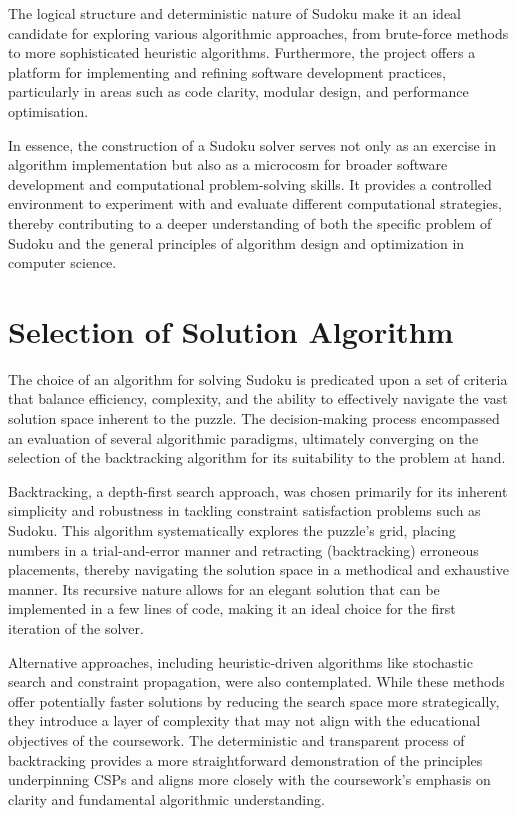 \documentclass[11pt]{article}
\begin{document}
The logical structure and deterministic nature of Sudoku make it an ideal candidate for exploring various algorithmic approaches, from brute-force methods to more sophisticated heuristic algorithms. Furthermore, the project offers a platform for implementing and refining software development practices, particularly in areas such as code clarity, modular design, and performance optimisation.

In essence, the construction of a Sudoku solver serves not only as an exercise in algorithm implementation but also as a microcosm for broader software development and computational problem-solving skills. It provides a controlled environment to experiment with and evaluate different computational strategies, thereby contributing to a deeper understanding of both the specific problem of Sudoku and the general principles of algorithm design and optimization in computer science.

\section{Selection of Solution Algorithm}

The choice of an algorithm for solving Sudoku is predicated upon a set of criteria that balance efficiency, complexity, and the ability to effectively navigate the vast solution space inherent to the puzzle. The decision-making process encompassed an evaluation of several algorithmic paradigms, ultimately converging on the selection of the backtracking algorithm for its suitability to the problem at hand.

Backtracking, a depth-first search approach, was chosen primarily for its inherent simplicity and robustness in tackling constraint satisfaction problems such as Sudoku. This algorithm systematically explores the puzzle's grid, placing numbers in a trial-and-error manner and retracting (backtracking) erroneous placements, thereby navigating the solution space in a methodical and exhaustive manner. Its recursive nature allows for an elegant solution that can be implemented in a few lines of code, making it an ideal choice for the first iteration of the solver.

Alternative approaches, including heuristic-driven algorithms like stochastic search and constraint propagation, were also contemplated. While these methods offer potentially faster solutions by reducing the search space more strategically, they introduce a layer of complexity that may not align with the educational objectives of the coursework. The deterministic and transparent process of backtracking provides a more straightforward demonstration of the principles underpinning CSPs and aligns more closely with the coursework's emphasis on clarity and fundamental algorithmic understanding.
\end{document}
